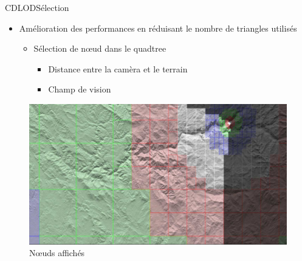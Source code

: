 \documentclass[french]{beamer}
\begin{document}
\begin{frame}{CDLOD}{Sélection}

\begin{itemize}
    \item Amélioration des performances en réduisant le nombre de triangles utilisés
    \begin{itemize}
        \item Sélection de n\oe{}ud dans le quadtree
        \begin{itemize}
            \item Distance entre la camèra et le terrain
            \item Champ de vision
        \end{itemize}
    \end{itemize}
\end{itemize}


\begin{figure}
   \includegraphics[scale=0.55]{img/selection.png}
   \caption{N\oe{}uds affichés \protect\footnotemark}
\end{figure}
    

\end{frame}
\end{document}
